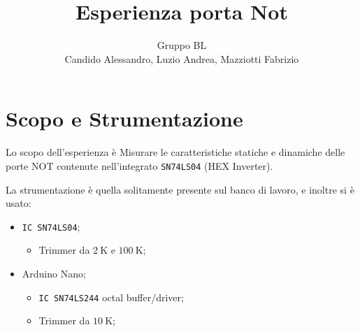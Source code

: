 \documentclass[a4paper,10pt]{article}
\title{Esperienza porta Not} %
\author{Gruppo BL \\ Candido Alessandro, Luzio Andrea, Mazziotti Fabrizio}
\def\code#1{\texttt{#1}}
\begin{document}
\maketitle




\section{Scopo e Strumentazione}
Lo scopo dell'esperienza è Misurare le caratteristiche statiche e dinamiche delle porte NOT contenute nell’integrato \code{SN74LS04} (HEX Inverter).

La strumentazione è quella solitamente presente sul banco di lavoro, e inoltre si è usato:
\begin{itemize}
	\item \code{IC SN74LS04};
	\begin{itemize}
		\item Trimmer da $2~$K e $100~$K;
	\end{itemize}
	\item Arduino Nano; 
	\begin{itemize}
		\item \code{IC SN74LS244} octal buffer/driver; 
		\item Trimmer da $10~$K;
	\end{itemize}
\end{itemize}

%
%
%
\end{document}

